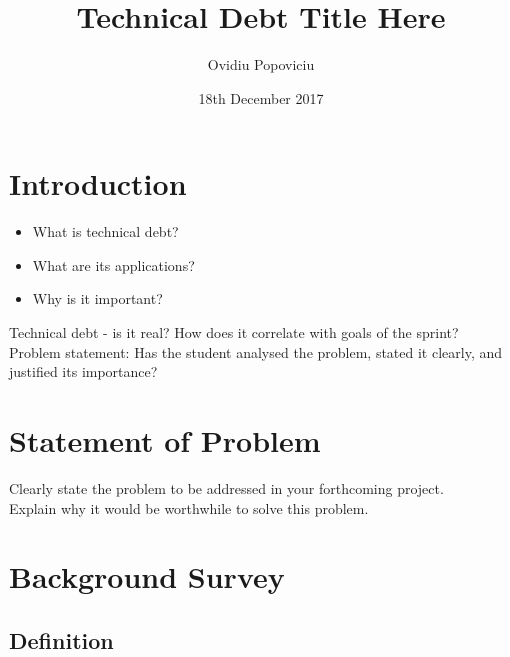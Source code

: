\documentclass{mprop}
\begin{document}
\title{Technical Debt Title Here}
\author{Ovidiu Popoviciu}
\date{18th December 2017}
\maketitle

\tableofcontents
\newpage

\section{Introduction}\label{intro}

\begin{itemize}
	\item What is technical debt?
	\item What are its applications?
	\item Why is it important?
\end{itemize}

Technical debt - is it real? How does it correlate with goals of the sprint?\\

Problem statement: Has the student analysed the problem, stated it clearly, and justified its importance?

\section{Statement of Problem}

Clearly state the problem to be addressed in your forthcoming project.\\

Explain why it would be worthwhile to solve this problem. \\

\section{Background Survey}
\subsection{Definition}
\end{document}
